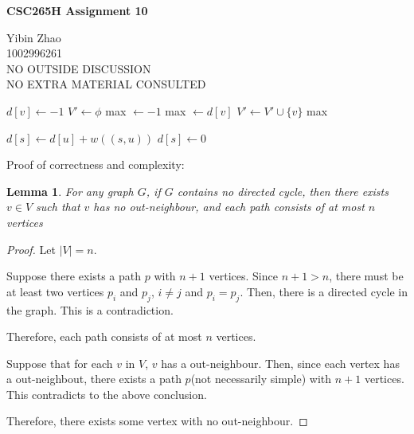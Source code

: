 \documentclass[10pt]{article}
\newtheorem{lemma}[theorem]{Lemma}
\begin{document}
\begin{center}
{\bf \Large \bf CSC265H Assignment 10}
\end{center}

\noindent
Yibin Zhao\\
1002996261\\
NO OUTSIDE DISCUSSION\\
NO EXTRA MATERIAL CONSULTED\\

\begin{comment}
	Give an algorithm that, given a directed graph $G=(V,E)$ which contains no
	directed cycle and a weight function $w: E \rightarrow \mathbb{R}$, find
	a maximum weight path in $O(|V|+|E|)$ time.

	Prove that your algorithm is correct and has the required time complexity.
\end{comment}

\begin{algorithmic}[1]
			\State $d[v] \gets -1$
		\EndFor
		\State $V' \gets \phi$
		\State max $\gets -1$
				\State {}
			\EndIf
				\State max $\gets d[v]$
			\EndIf
			\State $V' \gets V' \cup \{v\}$
		\EndFor
		\State \Return max
	\EndFunction
\end{algorithmic}

\vspace{5mm}

\begin{algorithmic}[1]
				\State {}
			\EndIf
				\State $d[s] \gets d[u] + w((s, u))$ 
			\EndIf
		\EndFor
			\State $d[s] \gets 0$
		\EndIf
	\EndFunction
\end{algorithmic}

\vspace{5mm}

Proof of correctness and complexity:

\begin{lemma}
	For any graph $G$, if $G$ contains no directed cycle, then there exists $v
	\in V$ such that $v$ has no out-neighbour, and each path consists
	of at most $n$ vertices
\end{lemma}
\begin{proof}
	Let $|V| = n$.

	Suppose there exists a path $p$ with $n+1$ vertices.
	Since $n+1 > n$, there must be at least two vertices $p_i$ and $p_j$, $i
	\neq j$ and $p_i = p_j$.
	Then, there is a directed cycle in the graph.
	This is a contradiction.
	
	Therefore, each path consists of at most $n$ vertices. 
	
	Suppose that for each $v$ in $V$, $v$ has a out-neighbour.
	Then, since each vertex has a out-neighbout, there exists a path $p$(not
	necessarily simple) with $n+1$ vertices.
	This contradicts to the above conclusion. 

	Therefore, there exists some vertex with no out-neighbour.
\end{proof}
\end{document}
